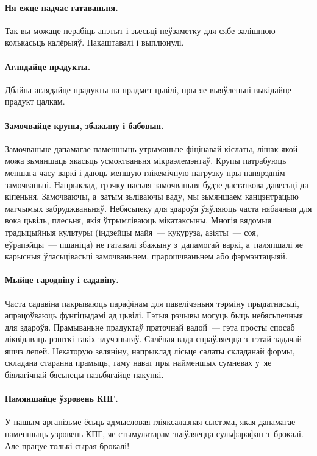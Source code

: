 \paragraph{Ня ежце падчас гатаваньня.}
Так вы можаце перабіць апэтыт і зьесьці неўзаметку для сябе залішнюю колькасьць калёрыяў. Пакаштавалі і выплюнулі.

\paragraph{Аглядайце прадукты.}
Дбайна аглядайце прадукты на прадмет цьвілі, пры яе выяўленьні выкідайце прадукт цалкам.

\paragraph{Замочвайце крупы, збажыну і бабовыя.}
Замочваньне дапамагае паменшыць утрыманьне фіцінавай кіслаты, лішак якой можа зьмяншаць якасьць усмоктваньня мікраэлемэнтаў. Крупы патрабуюць меншага часу варкі і даюць меншую глікемічную нагрузку пры папярэднім замочваньні. Напрыклад, грэчку пасьля замочваньня будзе дастаткова давесьці да кіпеньня. Замочваючы, а~затым зьліваючы ваду, мы зьмяншаем канцэнтрацыю магчымых забруджваньняў. Небясьпеку для здароўя ўяўляюць часта нябачныя для вока цьвіль, плесьня, якія ўтрымліваюць мікатаксыны. Многія вядомыя традыцыйныя культуры (індзейцы майя~--- кукуруза, азіяты~--- соя, еўрапэйцы~--- пшаніца) не гатавалі збажыну з~дапамогай варкі, а~паляпшалі яе карысныя ўласьцівасьці замочваньнем, прарошчваньнем або фэрмэнтацыяй.

\paragraph{Мыйце гародніну і садавіну.}
Часта садавіна пакрываюць парафінам для павелічэньня тэрміну прыдатнасьці, апрацоўваюць фунгіцыдамі ад цьвілі. Гэтыя рэчывы могуць быць небясьпечныя для здароўя. Прамываньне прадуктаў праточнай вадой~--- гэта просты спосаб ліквідаваць рэшткі такіх злучэньняў. Салёная вада спраўляецца з~гэтай задачай яшчэ лепей. Некаторую зеляніну, напрыклад лісьце салаты складанай формы, складана старанна прамыць, таму нават пры найменшых сумневах у~яе біялагічнай бясьпецы пазьбягайце пакупкі.

\paragraph{Памяншайце ўзровень КПГ.}
У нашым арганізьме ёсьць адмысловая гліяксалазная сыстэма, якая дапамагае паменшыць узровень КПГ, яе стымулятарам зьяўляецца сульфарафан з~брокалі. Але працуе толькі сырая брокалі!

